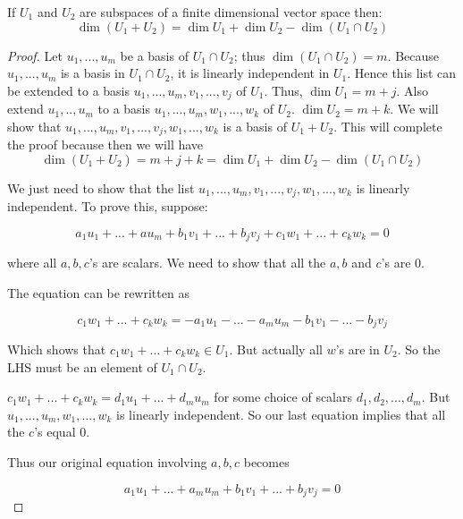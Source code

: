 \documentclass[12pt]{article}
\theoremstyle{definition}
\theoremstyle{remark}
\begin{document}
    \begin{proposition}
        If $U_1$ and $U_2$ are subspaces of a finite dimensional vector space then: 
        $$\dim(U_1+U_2)=\dim U_1 + \dim U_2 - \dim(U_1 \cap U_2)$$       
        \begin{proof}
            Let $u_1,...,u_m$ be a basis of $U_1\cap U_2$; thus $\dim (U_1\cap U_2)=m$. 
            Because $u_1,...,u_m$ is a basis in $U_1\cap U_2$, it is linearly independent in $U_1$. 
            Hence this list can be extended to a basis $u_1,...,u_m,v_1,...,v_j$ of $U_1$. 
            Thus, $\dim U_1 = m+j$. Also extend $u_1,..,u_m$ to a basis $u_1,...,u_m, w_1,...,w_k$ of 
            $U_2$. $\dim U_2 = m +k$. We will show that $u_1,...,u_m,v_1,...,v_j,w_1,...,w_k$ is a basis 
            of $U_1+U_2$. This will complete the proof because then we will have 
            $$\dim(U_1+U_2)=m+j+k=\dim U_1 + \dim U_2 - \dim (U_1\cap U_2)$$

            We just need to show that the list $u_1,...,u_m,v_1,...,v_j,w_1,...,w_k$ is linearly independent. 
            To prove this, suppose: 

            $$a_1u_1+...+au_m+b_1v_1+...+b_jv_j+c_1w_1+...+c_kw_k=0$$

            where all $a,b,c$'s are scalars. We need to show that all the $a,b$ and $c$'s are $0$.

            The equation can be rewritten as 

            $$c_1w_1+...+c_kw_k=-a_1u_1 - ... -a_mu_m -b_1v_1 - ... - b_j v_j$$

            Which shows that $c_1w_1+...+c_kw_k\in U_1$. But actually all $w$'s are in $U_2$. So the LHS 
            must be an element of $U_1\cap U_2$.

            $c_1w_1+...+c_kw_k=d_1u_1+...+d_mu_m$ for some choice of scalars $d_1,d_2,...,d_m$. 
            But $u_1,...,u_m,w_1,...,w_k$ is linearly independent. So our last equation implies 
            that all the $c$'s equal $0$.

            Thus our original equation involving $a,b,c$ becomes

            $$a_1u_1+...+a_mu_m+b_1v_1+...+b_jv_j=0$$


\end{proof}
\end{proposition}
\end{document}
